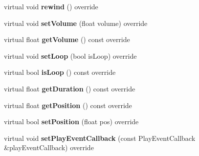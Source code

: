 \begin{DoxyCompactItemize}
\mbox{\label{classcocos2d_1_1experimental_1_1UrlAudioPlayer_ac5c1c8e67d3b99a7c82f054c729a564c}} 
virtual void {\bfseries rewind} () override
\item 
\mbox{\label{classcocos2d_1_1experimental_1_1UrlAudioPlayer_a3a4df42f60f7271801a13ed5224abde5}} 
virtual void {\bfseries set\+Volume} (float volume) override
\item 
\mbox{\label{classcocos2d_1_1experimental_1_1UrlAudioPlayer_abb76f63117c138ce4229ea2058240bdb}} 
virtual float {\bfseries get\+Volume} () const override
\item 
\mbox{\label{classcocos2d_1_1experimental_1_1UrlAudioPlayer_a0b2ad302c07fb3b2e45e29d7c6d24f5c}} 
virtual void {\bfseries set\+Loop} (bool is\+Loop) override
\item 
\mbox{\label{classcocos2d_1_1experimental_1_1UrlAudioPlayer_a610d312bbb473c76d80a142a636b89b1}} 
virtual bool {\bfseries is\+Loop} () const override
\item 
\mbox{\label{classcocos2d_1_1experimental_1_1UrlAudioPlayer_adc9794bcd6b50ba4ab644944aa9daa70}} 
virtual float {\bfseries get\+Duration} () const override
\item 
\mbox{\label{classcocos2d_1_1experimental_1_1UrlAudioPlayer_aa5b87eb466027471d10dde36aef8c7cf}} 
virtual float {\bfseries get\+Position} () const override
\item 
\mbox{\label{classcocos2d_1_1experimental_1_1UrlAudioPlayer_ae36c10b08ec7e2b0b2e36cd9985b8fb2}} 
virtual bool {\bfseries set\+Position} (float pos) override
\item 
\mbox{\label{classcocos2d_1_1experimental_1_1UrlAudioPlayer_a9fdf80a218cb7ab3902749d855584769}} 
virtual void {\bfseries set\+Play\+Event\+Callback} (const Play\+Event\+Callback \&play\+Event\+Callback) override

\end{DoxyCompactItemize}
